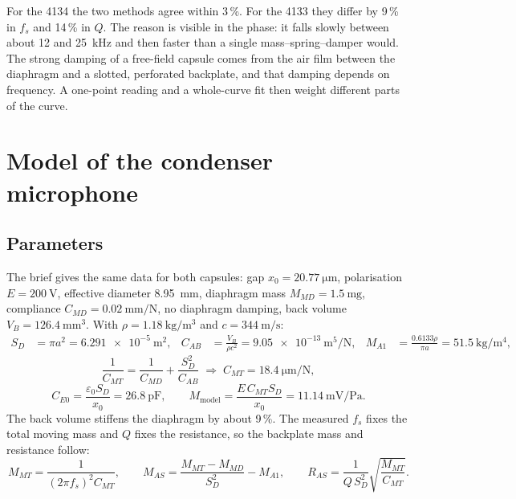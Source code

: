 \documentclass[a4paper,10pt]{article}
\begin{document}
For the 4134 the two methods agree within 3\,\%. For the 4133 they differ by 9\,\% in
$f_s$ and 14\,\% in $Q$. The reason is visible in the phase: it falls slowly between
about 12 and \SI{25}{\kilo\hertz} and then faster than a single mass--spring--damper
would. The strong damping of a free-field capsule comes
from the air film between the diaphragm and a slotted, perforated backplate, and that
damping depends on frequency. A one-point reading and a whole-curve fit then weight
different parts of the curve.

\section{Model of the condenser microphone}
\subsection{Parameters}
The brief gives the same data for both capsules: gap $x_0=\SI{20.77}{\micro\metre}$,
polarisation $E=\SI{200}{\volt}$, effective diameter \SI{8.95}{\milli\metre}, diaphragm
mass $M_{MD}=\SI{1.5}{\milli\gram}$, compliance $C_{MD}=\SI{0.02}{\milli\metre\per\newton}$,
no diaphragm damping, back volume $V_B=\SI{126.4}{\milli\metre\cubed}$. With
$\rho=\SI{1.18}{\kilo\gram\per\metre\cubed}$ and $c=\SI{344}{\metre\per\second}$:
\begin{align}
S_D&=\pi a^2=\SI{6.291e-5}{\metre\squared}, &
C_{AB}&=\frac{V_B}{\rho c^2}=\SI{9.05e-13}{\metre\tothe{5}\per\newton}, &
M_{A1}&=\frac{0.6133\rho}{\pi a}=\SI{51.5}{\kilo\gram\per\metre\tothe{4}},
\end{align}
\begin{equation}
\frac{1}{C_{MT}}=\frac{1}{C_{MD}}+\frac{S_D^2}{C_{AB}}\;\Rightarrow\;C_{MT}=\SI{18.4}{\micro\metre\per\newton},
\end{equation}
\begin{equation}
C_{E0}=\frac{\varepsilon_0 S_D}{x_0}=\SI{26.8}{\pico\farad},\qquad
M_{\mathrm{model}}=\frac{E\,C_{MT}S_D}{x_0}=\SI{11.14}{\milli\volt\per\pascal}.
\end{equation}
The back volume stiffens the diaphragm by about 9\,\%. The measured $f_s$ fixes the
total moving mass and $Q$ fixes the resistance, so the backplate mass and resistance
follow:
\begin{equation}
M_{MT}=\frac{1}{(2\pi f_s)^2C_{MT}},\qquad
M_{AS}=\frac{M_{MT}-M_{MD}}{S_D^2}-M_{A1},\qquad
R_{AS}=\frac{1}{Q\,S_D^2}\sqrt{\frac{M_{MT}}{C_{MT}}}.
\end{equation}
\end{document}
